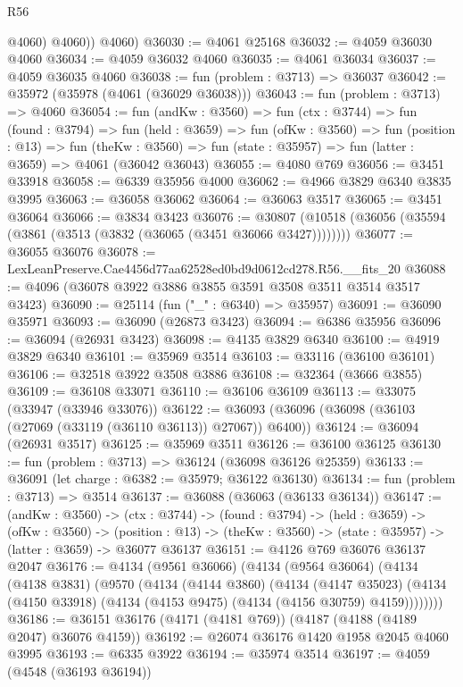 \begin{lexlean}{R56}
\begin{coremodule}
            @4060)
          @4060))
      @4060)
@36030 := @4061 @25168
@36032 := @4059 @36030 @4060
@36034 := @4059 @36032 @4060
@36035 := @4061 @36034
@36037 := @4059 @36035 @4060
@36038 := fun (problem : @3713) => @36037
@36042 := @35972 (@35978 (@4061 (@36029 @36038)))
@36043 := fun (problem : @3713) => @4060
@36054 := fun (andKw : @3560) =>
  fun (ctx : @3744) =>
  fun (found : @3794) =>
  fun (held : @3659) =>
  fun (ofKw : @3560) =>
  fun (position : @13) =>
  fun (theKw : @3560) => fun (state : @35957) => fun (latter : @3659) => @4061 (@36042 @36043)
@36055 := @4080 @769
@36056 := @3451 @33918
@36058 := @6339 @35956 @4000
@36062 := @4966 @3829 @6340 @3835 @3995
@36063 := @36058 @36062
@36064 := @36063 @3517
@36065 := @3451 @36064
@36066 := @3834 @3423
@36076 := @30807 (@10518 (@36056 (@35594 (@3861 (@3513 (@3832 (@36065 (@3451 @36066 @3427))))))))
@36077 := @36055 @36076
@36078 := LexLeanPreserve.Cae4456d77aa62528ed0bd9d0612cd278.R56.__fits_20
@36088 := @4096 (@36078 @3922 @3886 @3855 @3591 @3508 @3511 @3514 @3517 @3423)
@36090 := @25114 (fun ("_" : @6340) => @35957)
@36091 := @36090 @35971
@36093 := @36090 (@26873 @3423)
@36094 := @6386 @35956
@36096 := @36094 (@26931 @3423)
@36098 := @4135 @3829 @6340
@36100 := @4919 @3829 @6340
@36101 := @35969 @3514
@36103 := @33116 (@36100 @36101)
@36106 := @32518 @3922 @3508 @3886
@36108 := @32364 (@3666 @3855)
@36109 := @36108 @33071
@36110 := @36106 @36109
@36113 := @33075 (@33947 (@33946 @33076))
@36122 := @36093 (@36096 (@36098 (@36103 (@27069 (@33119 (@36110 @36113)) @27067)) @6400))
@36124 := @36094 (@26931 @3517)
@36125 := @35969 @3511
@36126 := @36100 @36125
@36130 := fun (problem : @3713) => @36124 (@36098 @36126 @25359)
@36133 := @36091 (let charge : @6382 := @35979; @36122 @36130)
@36134 := fun (problem : @3713) => @3514
@36137 := @36088 (@36063 (@36133 @36134))
@36147 := (andKw : @3560) ->
  (ctx : @3744) ->
  (found : @3794) ->
  (held : @3659) ->
  (ofKw : @3560) ->
  (position : @13) -> (theKw : @3560) -> (state : @35957) -> (latter : @3659) -> @36077 @36137
@36151 := @4126 @769 @36076 @36137 @2047
@36176 := @4134
    (@9561 @36066)
    (@4134
      (@9564 @36064)
      (@4134
        (@4138 @3831)
        (@9570
          (@4134
            (@4144 @3860)
            (@4134
              (@4147 @35023)
              (@4134 (@4150 @33918) (@4134 (@4153 @9475) (@4134 (@4156 @30759) @4159))))))))
@36186 := @36151 @36176 (@4171 (@4181 @769)) (@4187 (@4188 (@4189 @2047) @36076 @4159))
@36192 := @26074 @36176 @1420 @1958 @2045 @4060 @3995
@36193 := @6335 @3922
@36194 := @35974 @3514
@36197 := @4059 (@4548 (@36193 @36194))

\end{coremodule}
\end{lexlean}

